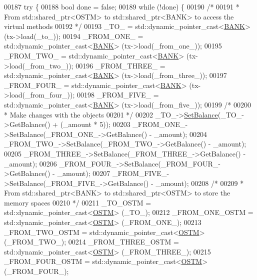 \begin{DoxyCode}
00187     \textcolor{keywordflow}{try} \{
00188         \textcolor{keywordtype}{bool} done = \textcolor{keyword}{false};
00189         \textcolor{keywordflow}{while} (!done) \{
00190             \textcolor{comment}{/*}
00191 \textcolor{comment}{             * From std::shared\_ptr<OSTM> to std::shared\_ptr<BANK> to access the virtual methods}
00192 \textcolor{comment}{             */}
00193             \_TO\_ = std::dynamic\_pointer\_cast<\hyperlink{class_b_a_n_k}{BANK}> (tx->load(\_to\_));
00194             \_FROM\_ONE\_ = std::dynamic\_pointer\_cast<\hyperlink{class_b_a_n_k}{BANK}> (tx->load(\_from\_one\_));
00195             \_FROM\_TWO\_ = std::dynamic\_pointer\_cast<\hyperlink{class_b_a_n_k}{BANK}> (tx->load(\_from\_two\_));
00196             \_FROM\_THREE\_ = std::dynamic\_pointer\_cast<\hyperlink{class_b_a_n_k}{BANK}> (tx->load(\_from\_three\_));
00197             \_FROM\_FOUR\_ = std::dynamic\_pointer\_cast<\hyperlink{class_b_a_n_k}{BANK}> (tx->load(\_from\_four\_));
00198             \_FROM\_FIVE\_ = std::dynamic\_pointer\_cast<\hyperlink{class_b_a_n_k}{BANK}> (tx->load(\_from\_five\_));
00199             \textcolor{comment}{/*}
00200 \textcolor{comment}{             * Make changes with the objects}
00201 \textcolor{comment}{             */}
00202             \_TO\_->\hyperlink{class_b_a_n_k_ae3e45b407bf8ec7175662442ea24b7c0_ae3e45b407bf8ec7175662442ea24b7c0}{SetBalance}(\_TO\_->GetBalance() + (\_amount * 5));
00203             \_FROM\_ONE\_->SetBalance(\_FROM\_ONE\_->GetBalance() - \_amount);
00204             \_FROM\_TWO\_->SetBalance(\_FROM\_TWO\_->GetBalance() - \_amount);
00205             \_FROM\_THREE\_->SetBalance(\_FROM\_THREE\_->GetBalance() - \_amount);
00206             \_FROM\_FOUR\_->SetBalance(\_FROM\_FOUR\_->GetBalance() - \_amount);
00207             \_FROM\_FIVE\_->SetBalance(\_FROM\_FIVE\_->GetBalance() - \_amount);
00208             \textcolor{comment}{/*}
00209 \textcolor{comment}{             * From std::shared\_ptr<BANK> to std::shared\_ptr<OSTM> to store the memory spaces}
00210 \textcolor{comment}{             */}
00211             \_TO\_OSTM = std::dynamic\_pointer\_cast<\hyperlink{class_o_s_t_m}{OSTM}> (\_TO\_);
00212             \_FROM\_ONE\_OSTM = std::dynamic\_pointer\_cast<\hyperlink{class_o_s_t_m}{OSTM}> (\_FROM\_ONE\_);
00213             \_FROM\_TWO\_OSTM = std::dynamic\_pointer\_cast<\hyperlink{class_o_s_t_m}{OSTM}> (\_FROM\_TWO\_);
00214             \_FROM\_THREE\_OSTM = std::dynamic\_pointer\_cast<\hyperlink{class_o_s_t_m}{OSTM}> (\_FROM\_THREE\_);
00215             \_FROM\_FOUR\_OSTM = std::dynamic\_pointer\_cast<\hyperlink{class_o_s_t_m}{OSTM}> (\_FROM\_FOUR\_);

\end{DoxyCode}

